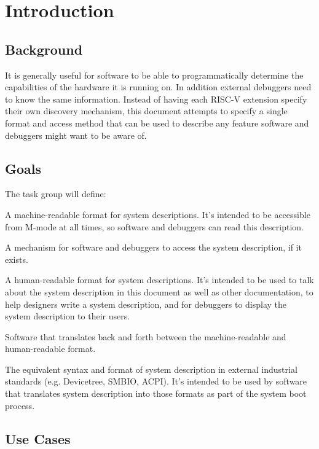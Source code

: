 \chapter{Introduction}

\section{Background}

It is generally useful for software to be able to programmatically determine the
capabilities of the hardware it is running on. In addition external debuggers
need to know the same information. Instead of having each RISC-V extension
specify their own discovery mechanism, this document attempts to specify a
single format and access method that can be used to describe any feature
software and debuggers might want to be aware of.

\section{Goals}

\begin{steps}{The task group will define:}
\item A machine-readable format for system descriptions. It's intended to be
accessible from M-mode at all times, so software and debuggers
can read this description.
\item A mechanism for software and debuggers to access the system description,
if it exists.
\item A human-readable format for system descriptions. It's intended to be used
to talk about the system description in this document as well as other
documentation, to help designers write a system description, and for debuggers
to display the system description to their users.
\item Software that translates back and forth between the machine-readable and
human-readable format.
\item The equivalent syntax and format of system description in external
industrial standards (e.g. Devicetree, SMBIO, ACPI). It's intended to be used
by software that translates system description into those formats as part of
the system boot process.
\end{steps}

\section{Use Cases}

